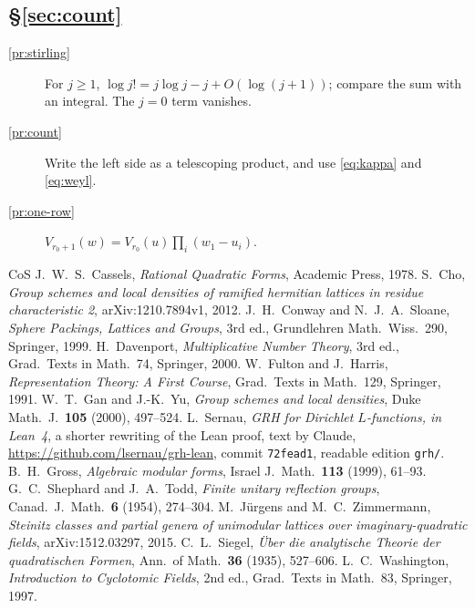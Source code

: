 \documentclass[reqno]{amsart}
\theoremstyle{definition}
\theoremstyle{plain}
\begin{document}
\subsection*{\S\ref{sec:count}}
\begin{description}
\item[\ref{pr:stirling}] For \(j\ge 1\), \(\log j! = j\log j - j + O(\log(j+1))\); compare the sum with an integral.  The \(j=0\) term vanishes.
\item[\ref{pr:count}] Write the left side as a telescoping product, and use \eqref{eq:kappa} and \eqref{eq:weyl}.
\item[\ref{pr:one-row}] \(V_{r_0+1}(w) = V_{r_0}(u) \prod_i (w_1 - u_i)\).
\end{description}

\begin{thebibliography}{CoS}
 J.~W.~S.~Cassels, \emph{Rational Quadratic Forms}, Academic Press, 1978.
 S.~Cho, \emph{Group schemes and local densities of ramified hermitian lattices in residue characteristic 2}, arXiv:1210.7894v1, 2012.
 J.~H.~Conway and N.~J.~A.~Sloane, \emph{Sphere Packings, Lattices and Groups}, 3rd ed., Grundlehren Math.\ Wiss.\ 290, Springer, 1999.
 H.~Davenport, \emph{Multiplicative Number Theory}, 3rd ed., Grad.\ Texts in Math.\ 74, Springer, 2000.
 W.~Fulton and J.~Harris, \emph{Representation Theory: A First Course}, Grad.\ Texts in Math.\ 129, Springer, 1991.
 W.~T.~Gan and J.-K.~Yu, \emph{Group schemes and local densities}, Duke Math.\ J.\ \textbf{105} (2000), 497--524.
 L.~Sernau, \emph{GRH for Dirichlet \(L\)-functions, in Lean~4}, a shorter rewriting of the Lean proof, text by Claude, \url{https://github.com/lsernau/grh-lean}, commit \texttt{72fead1}, readable edition \texttt{grh/}.
 B.~H.~Gross, \emph{Algebraic modular forms}, Israel J.\ Math.\ \textbf{113} (1999), 61--93.
 G.~C.~Shephard and J.~A.~Todd, \emph{Finite unitary reflection groups}, Canad.\ J.\ Math.\ \textbf{6} (1954), 274--304.
 M.~J\"urgens and M.~C.~Zimmermann, \emph{Steinitz classes and partial genera of unimodular lattices over imaginary-quadratic fields}, arXiv:1512.03297, 2015.
 C.~L.~Siegel, \emph{\"Uber die analytische Theorie der quadratischen Formen}, Ann.\ of Math.\ \textbf{36} (1935), 527--606.
 L.~C.~Washington, \emph{Introduction to Cyclotomic Fields}, 2nd ed., Grad.\ Texts in Math.\ 83, Springer, 1997.
\end{thebibliography}
\end{document}
